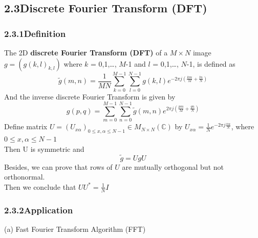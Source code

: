 \documentclass[12pt]{article}
\begin{document}
\subsection*{2.3\quad Discrete Fourier Transform (DFT)}

\subsubsection*{2.3.1\quad Definition}
The 2D \textbf{discrete Fourier Transform (DFT)} of a $M\times N$ image $g = (g(k,l)_{k,l})$ 
where $k$ = 0,1,\ldots, $M$-1 and $l$ = 0,1,\ldots, $N$-1, is defined as 
\begin{equation*}
    \tilde{g}(m,n) = \frac{1}{MN}\sum_{k=0}^{M-1}\sum_{l=0}^{N-1}g(k,l)e^{-2\pi j(\frac{km}{M}+\frac{ln}{N})}
\end{equation*}
And the inverse discrete Fourier Transform is given by
\begin{equation*}
    g(p,q) = \sum_{m=0}^{M-1}\sum_{n=0}^{N-1}\tilde{g}(m,n)e^{2\pi j(\frac{pm}{M}+\frac{qn}{N})}
\end{equation*}
Define matrix $U=(U_{x\alpha})_{0\leqslant x,\alpha \leqslant N-1}\in M_{N\times N}(\mathbb{C})$
by $U_{x\alpha}=\frac{1}{N} e^{-2\pi j\frac{x\alpha}{N}}$, where $0\leqslant x,\alpha \leqslant N-1$\\
Then U is symmetric and 
\begin{equation*}
    \tilde{g} = UgU
\end{equation*}
Besides, we can prove that rows of $U$ are mutually orthogonal but not orthonormal.\\
Then we conclude that $UU^{\ast}=\frac{1}{N}I$

\subsubsection*{2.3.2\quad Application}
(a) Fast Fourier Transform Algorithm (FFT)
\end{document}
